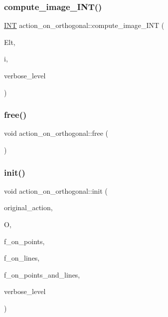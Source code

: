 \subsubsection{\texorpdfstring{compute\+\_\+image\+\_\+\+I\+N\+T()}{compute\_image\_INT()}}
{\footnotesize\ttfamily \mbox{\hyperlink{galois_8h_a09fddde158a3a20bd2dcadb609de11dc}{I\+NT}} action\+\_\+on\+\_\+orthogonal\+::compute\+\_\+image\+\_\+\+I\+NT (\begin{DoxyParamCaption}\item[{\mbox{\hyperlink{galois_8h_a09fddde158a3a20bd2dcadb609de11dc}{I\+NT}} $\ast$}]{Elt,  }\item[{\mbox{\hyperlink{galois_8h_a09fddde158a3a20bd2dcadb609de11dc}{I\+NT}}}]{i,  }\item[{\mbox{\hyperlink{galois_8h_a09fddde158a3a20bd2dcadb609de11dc}{I\+NT}}}]{verbose\+\_\+level }\end{DoxyParamCaption})}

\mbox{\label{classaction__on__orthogonal_a44eaca6df9aa227c3f8263e08403aabf}} 
\subsubsection{\texorpdfstring{free()}{free()}}
{\footnotesize\ttfamily void action\+\_\+on\+\_\+orthogonal\+::free (\begin{DoxyParamCaption}{ }\end{DoxyParamCaption})}

\mbox{\label{classaction__on__orthogonal_a5d66e1b51f4c836e358401dce9ed4ee6}} 
\subsubsection{\texorpdfstring{init()}{init()}}
{\footnotesize\ttfamily void action\+\_\+on\+\_\+orthogonal\+::init (\begin{DoxyParamCaption}\item[{\mbox{\hyperlink{classaction}{action}} $\ast$}]{original\+\_\+action,  }\item[{\mbox{\hyperlink{classorthogonal}{orthogonal}} $\ast$}]{O,  }\item[{\mbox{\hyperlink{galois_8h_a09fddde158a3a20bd2dcadb609de11dc}{I\+NT}}}]{f\+\_\+on\+\_\+points,  }\item[{\mbox{\hyperlink{galois_8h_a09fddde158a3a20bd2dcadb609de11dc}{I\+NT}}}]{f\+\_\+on\+\_\+lines,  }\item[{\mbox{\hyperlink{galois_8h_a09fddde158a3a20bd2dcadb609de11dc}{I\+NT}}}]{f\+\_\+on\+\_\+points\+\_\+and\+\_\+lines,  }\item[{\mbox{\hyperlink{galois_8h_a09fddde158a3a20bd2dcadb609de11dc}{I\+NT}}}]{verbose\+\_\+level }\end{DoxyParamCaption})}

